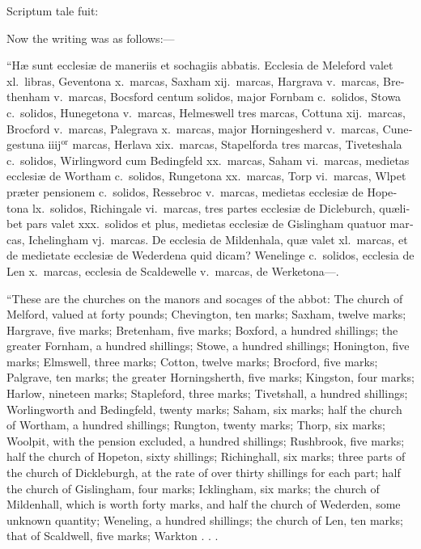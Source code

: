 \documentclass{book}
\begin{document}
\begin{paracol}{2}
\switchcolumn*

\begin{otherlanguage}{latin}
Scriptum tale fuit:
\end{otherlanguage}

\switchcolumn

Now the writing was as follows:---

\switchcolumn*

\begin{otherlanguage}{latin}
``H\ae{} sunt ecclesi\ae{} de maneriis et sochagiis abbatis. Ecclesia de Meleford valet xl.\ libras, Geventona x.\ marcas, Saxham xij.\ marcas, Hargrava v.\ marcas, Brethenham v.\ marcas, Bocsford centum solidos, major Fornbam c.\ solidos, Stowa c.\ solidos, Hunegetona v.\ marcas, Helmeswell tres marcas, Cottuna xij.\ marcas, Brocford v.\ marcas, Palegrava x.\ marcas, major Horningesherd v.\ marcas, Cunegestuna iiij$^\text{or}$ marcas, Herlava xix.\ marcas, Stapelforda tres marcas, Tiveteshala c.\ solidos, Wirlingword cum Bedingfeld xx.\ marcas, Saham vi.\ marcas, medietas ecclesi\ae{} de Wortham c.\ solidos, Rungetona xx.\ marcas, Torp vi.\ marcas, Wlpet pr\ae{}ter pensionem c.\ solidos, Ressebroc v.\ marcas, medietas ecclesi\ae{} de Hopetona lx.\ solidos, Richingale vi.\ marcas, tres partes ecclesi\ae{} de Dicleburch, qu\ae{}libet pars valet xxx.\ solidos et plus, medietas ecclesi\ae{} de Gislingham quatuor marcas, Ichelingham vj.\ marcas. De ecclesia de Mildenhala, qu\ae{} valet xl.\ marcas, et de medietate ecclesi\ae{} de Wederdena quid dicam? Wenelinge c.\ solidos, ecclesia de Len x.\ marcas, ecclesia de Scaldewelle v.\ marcas, de Werketona---.
\end{otherlanguage}

\switchcolumn

``These are the churches on the manors and socages of the abbot: The church of Melford, valued at forty pounds; Chevington, ten marks; Saxham, twelve marks; Hargrave, five marks; Bretenham, five marks; Boxford, a hundred shillings; the greater Fornham, a hundred shillings; Stowe, a hundred shillings; Honington, five marks; Elmswell, three marks; Cotton, twelve marks; Brocford, five marks; Palgrave, ten marks; the greater Horningsherth, five marks; Kingston, four marks; Harlow, nineteen marks; Stapleford, three marks; Tivetshall, a hundred shillings; Worlingworth and Bedingfeld, twenty marks; Saham, six marks; half the church of Wortham, a hundred shillings; Rungton, twenty marks; Thorp, six marks; Woolpit, with the pension excluded, a hundred shillings; Rushbrook, five marks; half the church of Hopeton, sixty shillings; Richinghall, six marks; three parts of the church of Dickleburgh, at the rate of over thirty shillings for each part; half the church of Gislingham, four marks; Icklingham, six marks; the church of Mildenhall, which is worth forty marks, and half the church of Wederden, some unknown quantity; Weneling, a hundred shillings; the church of Len, ten marks; that of Scaldwell, five marks; Warkton . . .


\end{paracol}
\end{document}
